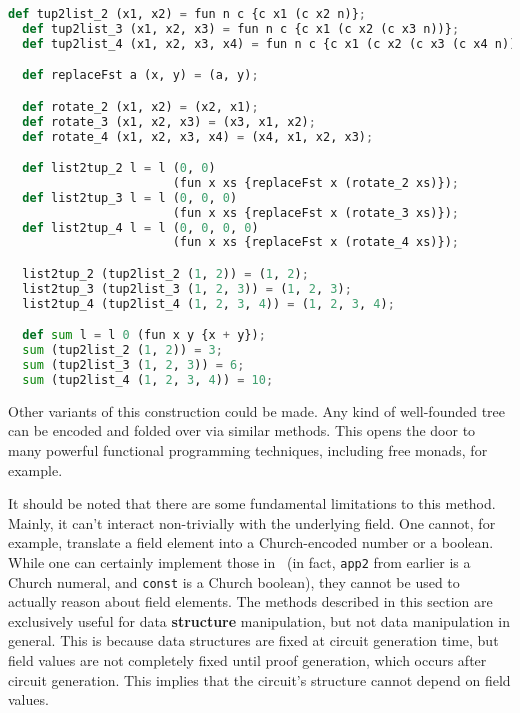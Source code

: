 \begin{lstlisting}[language=Python]
  def tup2list_2 (x1, x2) = fun n c {c x1 (c x2 n)};
  def tup2list_3 (x1, x2, x3) = fun n c {c x1 (c x2 (c x3 n))};
  def tup2list_4 (x1, x2, x3, x4) = fun n c {c x1 (c x2 (c x3 (c x4 n)))};

  def replaceFst a (x, y) = (a, y);

  def rotate_2 (x1, x2) = (x2, x1);
  def rotate_3 (x1, x2, x3) = (x3, x1, x2);
  def rotate_4 (x1, x2, x3, x4) = (x4, x1, x2, x3);

  def list2tup_2 l = l (0, 0) 
                       (fun x xs {replaceFst x (rotate_2 xs)});
  def list2tup_3 l = l (0, 0, 0) 
                       (fun x xs {replaceFst x (rotate_3 xs)});
  def list2tup_4 l = l (0, 0, 0, 0) 
                       (fun x xs {replaceFst x (rotate_4 xs)});

  list2tup_2 (tup2list_2 (1, 2)) = (1, 2);
  list2tup_3 (tup2list_3 (1, 2, 3)) = (1, 2, 3);
  list2tup_4 (tup2list_4 (1, 2, 3, 4)) = (1, 2, 3, 4);

  def sum l = l 0 (fun x y {x + y});
  sum (tup2list_2 (1, 2)) = 3;
  sum (tup2list_3 (1, 2, 3)) = 6;
  sum (tup2list_4 (1, 2, 3, 4)) = 10;
\end{lstlisting}

Other variants of this construction could be made. Any kind of well-founded tree can be encoded and folded over via similar methods. This opens the door to many powerful functional programming techniques, including free monads, for example.

It should be noted that there are some fundamental limitations to this method. Mainly, it can't interact non-trivially with the underlying field. One cannot, for example, translate a field element into a Church-encoded number or a boolean. While one can certainly implement those in \vampir\ (in fact, \lstinline|app2| from earlier is a Church numeral, and \lstinline|const| is a Church boolean), they cannot be used to actually reason about field elements. The methods described in this section are exclusively useful for data \textbf{structure} manipulation, but not data manipulation in general. This is because data structures are fixed at circuit generation time, but field values are not completely fixed until proof generation, which occurs after circuit generation. This implies that the circuit's structure cannot depend on field values.
